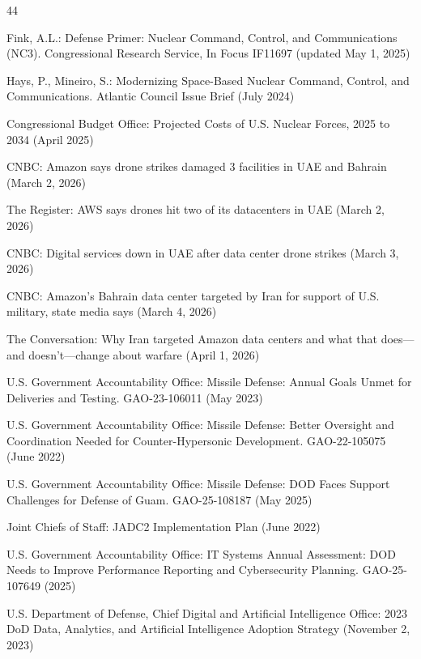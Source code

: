 \documentclass[runningheads]{llncs}
\begin{document}
\begin{thebibliography}{44}

 Fink, A.L.: Defense Primer: Nuclear Command, Control, and Communications (NC3). Congressional Research Service, In Focus IF11697 (updated May 1, 2025)

 Hays, P., Mineiro, S.: Modernizing Space-Based Nuclear Command, Control, and Communications. Atlantic Council Issue Brief (July 2024)

 Congressional Budget Office: Projected Costs of U.S. Nuclear Forces, 2025 to 2034 (April 2025)

 CNBC: Amazon says drone strikes damaged 3 facilities in UAE and Bahrain (March 2, 2026)

 The Register: AWS says drones hit two of its datacenters in UAE (March 2, 2026)

 CNBC: Digital services down in UAE after data center drone strikes (March 3, 2026)

 CNBC: Amazon's Bahrain data center targeted by Iran for support of U.S. military, state media says (March 4, 2026)

 The Conversation: Why Iran targeted Amazon data centers and what that does---and doesn't---change about warfare (April 1, 2026)

 U.S. Government Accountability Office: Missile Defense: Annual Goals Unmet for Deliveries and Testing. GAO-23-106011 (May 2023)

 U.S. Government Accountability Office: Missile Defense: Better Oversight and Coordination Needed for Counter-Hypersonic Development. GAO-22-105075 (June 2022)

 U.S. Government Accountability Office: Missile Defense: DOD Faces Support Challenges for Defense of Guam. GAO-25-108187 (May 2025)

 Joint Chiefs of Staff: JADC2 Implementation Plan (June 2022)

 U.S. Government Accountability Office: IT Systems Annual Assessment: DOD Needs to Improve Performance Reporting and Cybersecurity Planning. GAO-25-107649 (2025)

 U.S. Department of Defense, Chief Digital and Artificial Intelligence Office: 2023 DoD Data, Analytics, and Artificial Intelligence Adoption Strategy (November 2, 2023)


\end{thebibliography}
\end{document}
